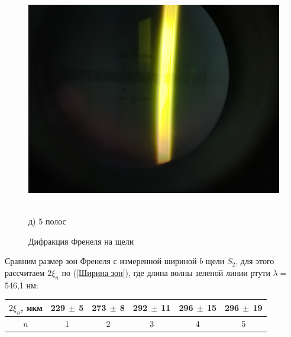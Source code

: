 \documentclass[a4paper, 12pt]{article}
\begin{document}
\begin{enumerate}
\begin{figure}[h!]
\begin{center}
\begin{minipage}{0.5\textwidth}
	\includegraphics[width=1\textwidth]{frenel-5.jpg}
	\begin{center}
	\\ д) 5 полос
	\end{center}
\end{minipage}
\end{center}
\caption{Дифракция Френеля на щели}
\end{figure}

\newpage
	Сравним размер зон Френеля с измеренной шириной $b$ щели $S_2$, для этого рассчитаем $2 \xi_n$ по (\ref{Ширина зон}), где длина волны зеленой линии ртути $\lambda = $ 546,1 нм:

	\begin{center}
		\begin{tabular}{|c|c|c|c|c|c|}
			\hline
			$2\xi_n$, мкм & 229$~\pm~$5 & 273$~\pm~$8 & 292$~\pm~$11 & 296$~\pm~$15 & 296$~\pm~$19 \\ \hline
			$n$           & 1   & 2   & 3   & 4   & 5   \\ \hline
		\end{tabular}
	\end{center}


\end{enumerate}
\end{document}
